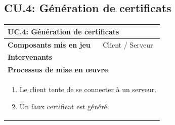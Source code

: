 \documentclass[a4paper,11pt,french]{article}
\begin{document}
\subsection{CU.4: Génération de certificats}
\begin{center}
        \vspace*{0.7cm}
        \begin{tabularx}{16cm}{|l|X|}
        \hline
        \multicolumn{2}{|l|}{\textbf{UC.4: Génération de certificats}}\\
        \hline
        \textbf{Composants mis en jeu} & Client / Serveur  \\
        \hline
        \textbf{Intervenants} & \\
        \hline
        \multicolumn{2}{|l|}{\textbf{Processus de mise en \oe uvre} }\\
        \hline
        \multicolumn{2}{|p{15cm}|}{\begin{enumerate}\item  Le client tente de se connecter à un serveur.\item Un faux certificat est généré.\end{enumerate}}\\ 
        \hline 
        \end{tabularx}
\end{center}
\vspace{2cm}
\end{document}
